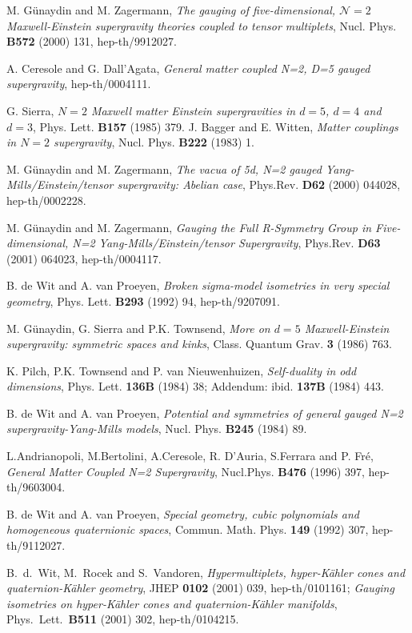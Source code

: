 \documentclass[a4paper,11pt]{article}
\begin{document}
\begin{thebibliography}{99}
 M. G\"{u}naydin and M. Zagermann, \emph{The gauging of
five-dimensional, $\mathcal{N}=2$ Maxwell-Einstein supergravity theories
coupled to tensor multiplets}, Nucl. Phys. \textbf{B572} (2000) 131,
hep-th/9912027.

 A. Ceresole and G. Dall'Agata, \emph{General matter
coupled N=2, D=5 gauged supergravity}, hep-th/0004111.

 G. Sierra, \emph{$N=2$ Maxwell matter Einstein
supergravities in $d=5$, $d=4$ and $d=3$}, Phys. Lett. \textbf{B157} (1985)
379.
 J. Bagger and E. Witten, \emph{Matter couplings in $N=2$ supergravity},
Nucl. Phys. \textbf{B222} (1983) 1.

 M. G\"{u}naydin and M. Zagermann, \emph{The vacua of
5d, N=2 gauged Yang-Mills/Einstein/tensor supergravity: Abelian case},
Phys.Rev. \textbf{D62} (2000) 044028,
hep-th/0002228.

 M. G\"{u}naydin and M. Zagermann, \emph{Gauging the
Full R-Symmetry Group in Five-dimensional, N=2 Yang-Mills/Einstein/tensor
Supergravity}, Phys.Rev. \textbf{D63} (2001) 064023, hep-th/0004117.


 B. de Wit and A. van Proeyen, \emph{Broken
sigma-model isometries in very special geometry},  Phys. Lett. \textbf{B293}
(1992) 94, hep-th/9207091.

 M. G\"{u}naydin, G. Sierra and P.K. Townsend,
\emph{More on $d=5$ Maxwell-Einstein supergravity: symmetric spaces and
kinks}, Class. Quantum Grav. \textbf{3} (1986) 763.


 K. Pilch, P.K. Townsend and P. van Nieuwenhuizen,
\emph{Self-duality in odd dimensions}, Phys. Lett. \textbf{136B}  (1984) 38;
Addendum: ibid. \textbf{137B} (1984) 443.

 B. de Wit and A. van Proeyen, \emph{Potential
and symmetries of general gauged N=2 supergravity-Yang-Mills models},
Nucl. Phys. \textbf{B245} (1984) 89.

 L.Andrianopoli, M.Bertolini, A.Ceresole, R. D'Auria,
S.Ferrara and P. Fr\'{e}, \emph{General Matter Coupled N=2 Supergravity},
Nucl.Phys. \textbf{B476} (1996) 397, hep-th/9603004.

 B. de Wit and A. van Proeyen, \emph{Special 
geometry, cubic polynomials and homogeneous quaternionic
spaces}, Commun. Math. Phys. \textbf{149} (1992) 307, hep-th/9112027.

B.~d.~Wit, M.~Rocek and S.~Vandoren,
\emph{Hypermultiplets, hyper-K\"{a}hler cones and quaternion-K\"{a}hler 
geometry},
JHEP {\bf 0102} (2001) 039,
hep-th/0101161;
\emph{Gauging isometries on hyper-K\"{a}hler
cones and
quaternion-K\"{a}hler manifolds},
Phys.\ Lett.\ \textbf{B511} (2001) 302,
hep-th/0104215.


\end{thebibliography}
\end{document}

